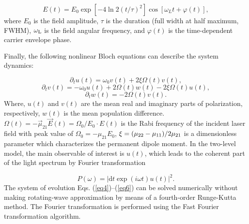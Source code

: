 \documentclass[10pt,letterpaper]{article}
\begin{document}
\begin{equation}
E(t) = {E_0}\exp \left[ { - 4\ln 2{{\left( {t/\tau } \right)}^2}} \right]\cos \left[ {{\omega _L}t + \varphi \left( t \right)} \right],
\label{eq3}
\end{equation}
where $ E_{0} $ is the field amplitude, $ \tau $ is the duration (full width at half maximum, FWHM), $ \omega_{\rm{L}} $ is the field angular frequency, and $ \varphi(t) $ is the time-dependent carrier envelope phase.

Finally, the following nonlinear Bloch equations can describe the system dynamics:

\begin{equation}
 {\partial _t}{u}\left( {t} \right) = {\omega _0}{v}\left( t \right) + 2\xi \Omega \left( t \right){v}\left( t \right),
\label{eq4}
\end{equation}
\begin{equation}
{\partial _t}{v}\left( {t} \right) =  - {\omega _0}{u}\left( t \right) + 2\Omega \left( t \right){w}\left( t \right) - 2\xi \Omega \left( t \right){u}\left( t \right),
\label{eq5}
\end{equation}
\begin{equation}
{\partial _t}{w}\left( {t} \right) =  - 2\Omega \left( t \right){v}\left( t \right).
\label{eq6}
\end{equation}
Where, $ u(t) $ and $ v(t) $ are the mean real and imaginary parts of polarization, respectively, $ w(t) $ is the mean population difference. $\Omega\left( t \right) = - \vec{\mu}_{21}\vec{E}\left(t\right)=\Omega_{0}/E_{0}\cdot E\left(t\right)$ is the Rabi frequency of the incident laser field with peak value of ${\Omega _0} =  - {\mu _{21}}{E_0}$, $\xi  = {{\left( {{\mu _{22}} - {\mu _{11}}} \right)} \mathord{\left/{\vphantom {{\left( {{\mu _{22}} - {\mu _{11}}} \right)} {2{\mu _{21}}}}} \right.\kern-\nulldelimiterspace} {2{\mu _{21}}}}$ is a dimensionless parameter which characterizes the permanent dipole moment. In the two-level model, the main observable of interest is $u(t)$, which leads to the coherent part of the light spectrum by Fourier transformation

\begin{equation}
P(\omega)= \left| \textrm{d}t\exp(i\omega t)u(t)\right|^2.
\label{eq7}
\end{equation}
The system of evolution Eqs. (\ref{eq4})--(\ref{eq6}) can be solved numerically without making rotating-wave approximation by means of a fourth-order Runge-Kutta method. The Fourier transformation is performed using the Fast Fourier transformation algorithm.
\end{document}
